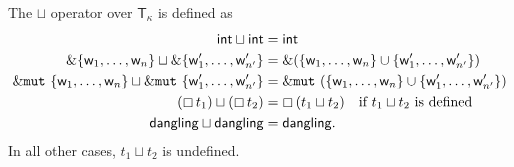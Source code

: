
\begin{definition}\label{def:lub}
  The $\sqcup$ operator over $\mathsf{T}_\kappa$ is defined as
  \begin{align*}
    \mathsf{int}\sqcup\mathsf{int} &= \mathsf{int}\\
    \&\{\mathsf{w}_1,\ldots,\mathsf{w}_n\} \sqcup \&\{\mathsf{w}'_1,\ldots,\mathsf{w}'_{n'}\} &= \&(\{\mathsf{w}_1,\ldots,\mathsf{w}_n\}\cup\{\mathsf{w}'_1,\ldots,\mathsf{w}'_{n'}\})\\
    \&\mathtt{mut}\ \{\mathsf{w}_1,\ldots,\mathsf{w}_n\} \sqcup \&\mathtt{mut}\ \{\mathsf{w}'_1,\ldots,\mathsf{w}'_{n'}\} &= \&\mathtt{mut}\ (\{\mathsf{w}_1,\ldots,\mathsf{w}_n\}\cup\{\mathsf{w}'_1,\ldots,\mathsf{w}'_{n'}\})\\
    (\boxempty\,{t_1}) \sqcup (\boxempty\,{t_2}) &=\boxempty\,{(t_1\sqcup t_2)}\quad\text{if $t_1\sqcup t_2$ is defined}\\
    \mathsf{dangling}\sqcup\mathsf{dangling} &= \mathsf{dangling}.
  \end{align*}
  In all other cases, $t_1\sqcup t_2$ is undefined.
\end{definition}


